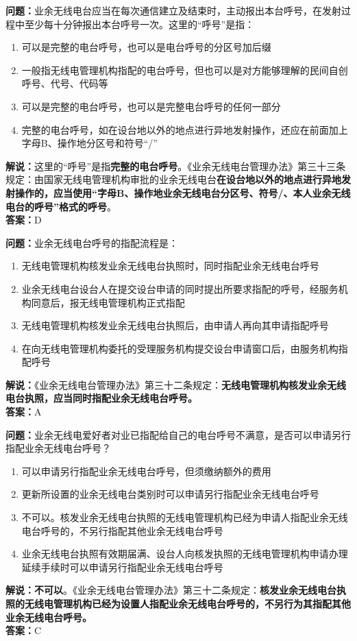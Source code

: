 \noindent\textbf{问题：}业余无线电台应当在每次通信建立及结束时，主动报出本台呼号，在发射过程中至少每十分钟报出本台呼号一次。这里的“呼号”是指：
\begin{enumerate}[label=\Alph*), leftmargin=3em]
	\item 可以是完整的电台呼号，也可以是电台呼号的分区号加后缀
	\item 一般指无线电管理机构指配的电台呼号，但也可以是对方能够理解的民间自创呼号、代号、代码等
	\item 可以是完整的电台呼号，也可以是完整电台呼号的任何一部分
	\item 完整的电台呼号，如在设台地以外的地点进行异地发射操作，还应在前面加上字母B、操作地分区号和符号“/”
\end{enumerate}
\noindent\textbf{解说：}这里的“呼号”是指\textbf{完整的电台呼号}。《业余无线电台管理办法》第三十三条规定：由国家无线电管理机构审批的业余无线电台\textbf{在设台地以外的地点进行异地发射操作的，应当使用“字母B、操作地业余无线电台分区号、符号/、本人业余无线电台的呼号”格式的呼号}。\\\noindent\textbf{答案：}D



\bigskip


\noindent\textbf{问题：}业余无线电台呼号的指配流程是：
\begin{enumerate}[label=\Alph*), leftmargin=3em]
	\item 无线电管理机构核发业余无线电台执照时，同时指配业余无线电台呼号
	\item 业余无线电台设台人在提交设台申请的同时提出所要求指配的呼号，经服务机构同意后，报无线电管理机构正式指配
	\item 无线电管理机构核发业余无线电台执照后，由申请人再向其申请指配呼号
	\item 在向无线电管理机构委托的受理服务机构提交设台申请窗口后，由服务机构指配呼号
\end{enumerate}
\noindent\textbf{解说：}《业余无线电台管理办法》第三十二条规定：\textbf{无线电管理机构核发业余无线电台执照，应当同时指配业余无线电台呼号。}\\\noindent\textbf{答案：}A



\bigskip


\noindent\textbf{问题：}业余无线电爱好者对业已指配给自己的电台呼号不满意，是否可以申请另行指配业余无线电台呼号？
\begin{enumerate}[label=\Alph*), leftmargin=3em]
	\item 可以申请另行指配业余无线电台呼号，但须缴纳额外的费用
	\item 更新所设置的业余无线电台类别时可以申请另行指配业余无线电台呼号
	\item 不可以。核发业余无线电台执照的无线电管理机构已经为申请人指配业余无线电台呼号的，不另行指配其他业余无线电台呼号
	\item 业余无线电台执照有效期届满、设台人向核发执照的无线电管理机构申请办理延续手续时可以申请另行指配业余无线电台呼号
\end{enumerate}
\textbf{解说：不可以}。《业余无线电台管理办法》第三十二条规定：\textbf{核发业余无线电台执照的无线电管理机构已经为设置人指配业余无线电台呼号的，不另行为其指配其他业余无线电台呼号。}\\\noindent\textbf{答案：}C


